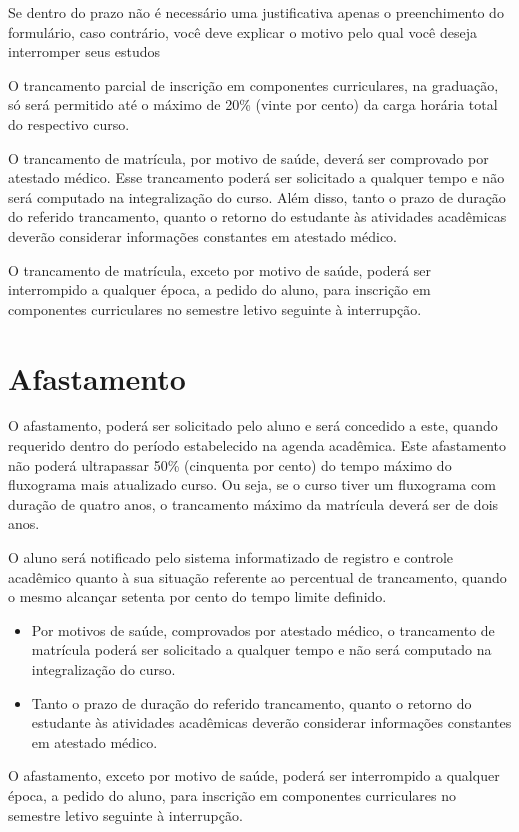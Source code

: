 Se dentro do prazo não é necessário uma justificativa apenas o preenchimento do formulário, caso contrário, você deve explicar o motivo pelo qual você deseja interromper seus estudos
    
O trancamento parcial de inscrição em componentes curriculares, na graduação, só será permitido até o máximo de 20\% (vinte por cento) da carga horária total do respectivo curso.

O trancamento de matrícula, por motivo de saúde, deverá ser comprovado por atestado médico. Esse trancamento poderá ser solicitado a qualquer tempo e não será computado na integralização do curso. Além disso, tanto o prazo de duração do referido trancamento, quanto o retorno do estudante às atividades acadêmicas deverão considerar informações constantes em atestado médico.
    
O trancamento de matrícula, exceto por motivo de saúde, poderá ser interrompido a qualquer época, a pedido do aluno, para inscrição em componentes curriculares no semestre letivo seguinte à interrupção.

\section{Afastamento}

O afastamento, poderá ser solicitado pelo aluno e será concedido a este, quando requerido dentro do período estabelecido na agenda acadêmica. Este afastamento não poderá ultrapassar 50\% (cinquenta por cento) do tempo máximo do fluxograma mais atualizado curso. Ou seja, se o curso tiver um fluxograma com duração de quatro anos, o trancamento máximo da matrícula deverá ser de dois anos.

O aluno será notificado pelo sistema informatizado de registro e controle acadêmico quanto à sua situação referente ao percentual de trancamento, quando o mesmo alcançar setenta por cento do tempo limite definido.

\begin{itemize}
    \item Por motivos de saúde, comprovados por atestado médico, o trancamento de matrícula poderá ser solicitado a qualquer tempo e não será computado na integralização do curso. 
    \item Tanto o prazo de duração do referido trancamento, quanto o retorno do estudante às atividades acadêmicas deverão considerar informações constantes em atestado médico.
\end{itemize}
O afastamento, exceto por motivo de saúde, poderá ser interrompido a qualquer época, a pedido do aluno, para inscrição em componentes curriculares no semestre letivo seguinte à interrupção. 

